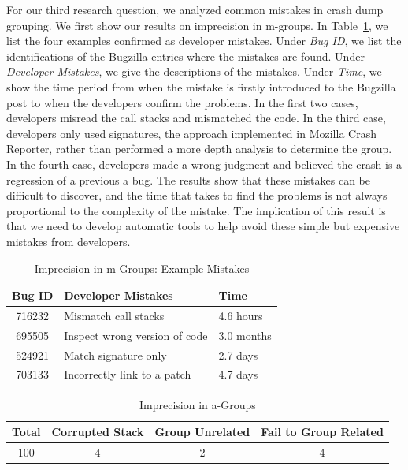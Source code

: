 \documentclass{llncs}
\begin{document}
For our third research question, we analyzed common mistakes in crash dump grouping. We first show our results on imprecision in m-groups. In Table~\ref{tab:mistake}, we list the four examples confirmed as developer mistakes. Under {\it Bug ID}, we list the identifications of the Bugzilla entries where the mistakes are found. Under {\it Developer Mistakes}, we give the descriptions of the mistakes. Under {\it Time}, we show the time period from when the mistake is firstly introduced to the Bugzilla post to when the developers confirm the problems. In the first two cases, developers misread the call stacks and mismatched the code. In the third case, developers only used signatures, the approach implemented in Mozilla Crash Reporter, rather than performed a more depth analysis to determine the group. In the fourth case, developers made a wrong judgment and believed the crash is a regression of a previous a bug. The results show that these mistakes can be difficult to discover, and the time that takes to find the problems is not always proportional to the complexity of the mistake. The implication of this result is that we need to develop automatic tools to help avoid these simple but expensive mistakes from developers.
\begin{table}[!htb]
\centering
\caption{Imprecision in m-Groups: Example Mistakes\label{tab:mistake}}
\begin{tabular}{|c||l|l|}\hline
Bug ID&Developer Mistakes&Time\\\hline\hline
716232&Mismatch call stacks&4.6 hours\\\hline
695505&Inspect wrong version of code&3.0 months\\\hline
524921&Match signature only&2.7 days \\\hline
703133&Incorrectly link to a patch& 4.7 days\\\hline
\end{tabular}
\end{table}

\begin{table}[!htb]
\centering
\caption{Imprecision in a-Groups\label{tab:agroup}}
\begin{tabular}{|c||c|c|c|}\hline
Total&Corrupted Stack&Group Unrelated& Fail to Group Related\\\hline\hline
100&4&2&4\\\hline
\end{tabular}

\end{table}
\end{document}
